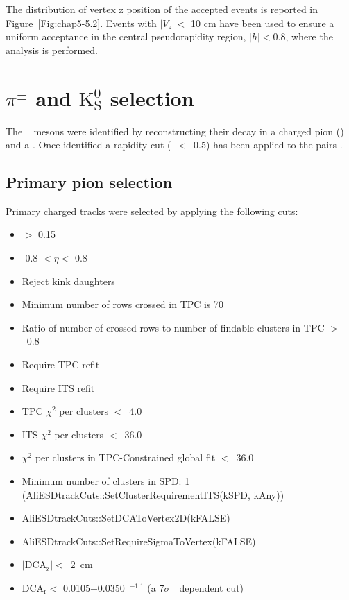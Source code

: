 The distribution of vertex z position of the accepted events is reported in \mbox{Figure \ref{Fig:chap5-5.2}}. Events with $|V_z| < $ 10 cm have been used to ensure a uniform acceptance in the central pseudorapidity region, $|h| < $0.8, where the analysis is performed.

\section{\ensuremath{\pi^{\pm}}  and $\mathrm {K^0_S}$ selection}
\label{par:5.3}
The \kstarch~ mesons were identified by reconstructing their decay in a charged pion (\ppm) and a \kshort. Once identified a rapidity cut (\modrap~$<$~0.5) has been applied to the pairs \ppm\VZERO.

\subsection{Primary pion selection}
\label{par:5.3a} 
Primary charged tracks were selected by applying the following cuts:
	
\begin{itemize}
\item  \pT $>$ 0.15 \gmom 
\item -0.8 $< \eta <$ 0.8
\item Reject kink daughters
\item Minimum number of rows crossed in TPC is 70
\item Ratio of number of crossed rows to number of findable clusters in TPC $>$~0.8
\item Require TPC refit
\item Require ITS refit
\item TPC $\chi^{2}$ per clusters $<$~4.0
\item ITS $\chi^{2}$ per clusters $<$~36.0
\item $\chi^{2}$ per clusters in TPC-Constrained global fit $<$~36.0
\item Minimum number of clusters in SPD: 1 (AliESDtrackCuts::SetClusterRequirementITS(kSPD, kAny))
\item AliESDtrackCuts::SetDCAToVertex2D(kFALSE)
\item AliESDtrackCuts::SetRequireSigmaToVertex(kFALSE) 
\item $\left | \mathrm{DCA}_{\mathrm{z}} \right | <$~2~cm
\item $\mathrm{DCA}_{\mathrm{r}}<$ 0.0105+0.0350~\pT$^{-1.1}$ (a 7$\sigma$~\pT~dependent cut)
\end{itemize}

